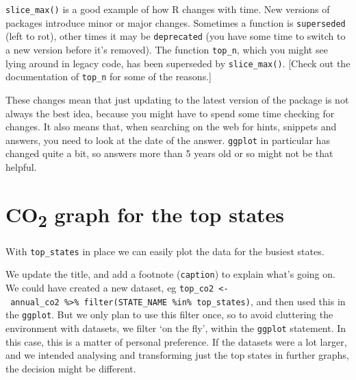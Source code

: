 \documentclass[
]{book}
\begin{document}
\texttt{slice\_max()} is a good example of how R changes with time. New versions of packages introduce minor or major changes. Sometimes a function is \texttt{superseded} (left to rot), other times it may be \texttt{deprecated} (you have some time to switch to a new version before it's removed). The function \texttt{top\_n}, which you might see lying around in legacy code, has been superseded by \texttt{slice\_max()}. {[}Check out the documentation of \texttt{top\_n} for some of the reasons.{]}

These changes mean that just updating to the latest version of the package is not always the best idea, because you might have to spend some time checking for changes. It also means that, when searching on the web for hints, snippets and answers, you need to look at the date of the answer. \texttt{ggplot} in particular has changed quite a bit, so answers more than 5 years old or so might not be that helpful.

\hypertarget{co2-graph-for-the-top-states}{%
\section{\texorpdfstring{CO\textsubscript{2} graph for the top states}{CO2 graph for the top states}}\label{co2-graph-for-the-top-states}}

With \texttt{top\_states} in place we can easily plot the data for the busiest states.

We update the title, and add a footnote (\texttt{caption}) to explain what's going on. We could have created a new dataset, eg \texttt{top\_co2\ \textless{}-\ annual\_co2\ \%\textgreater{}\%\ filter(STATE\_NAME\ \%in\%\ top\_states)}, and then used this in the \texttt{ggplot}. But we only plan to use this filter once, so to avoid cluttering the environment with datasets, we filter `on the fly', within the \texttt{ggplot} statement. In this case, this is a matter of personal preference. If the datasets were a lot larger, and we intended analysing and transforming just the top states in further graphs, the decision might be different.
\end{document}
